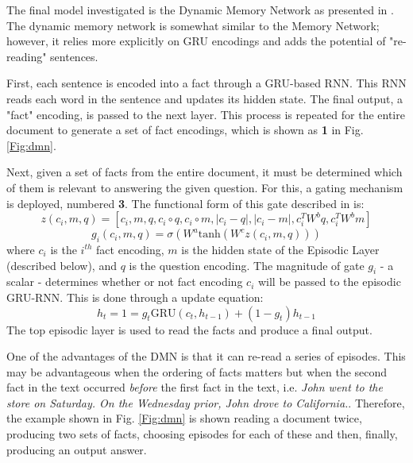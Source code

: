 \documentclass{article}
\begin{document}
The final model investigated is the Dynamic Memory Network as presented in \cite{dmn}.  The dynamic memory network is somewhat similar to the Memory Network; however, it relies more explicitly on GRU encodings and adds the potential of "re-reading" sentences.  \par
First, each sentence is encoded into a fact through a GRU-based RNN.  This RNN reads each word in the sentence and updates its hidden state.  The final output, a "fact" encoding, is passed to the next layer.  This process is repeated for the entire document to generate a set of fact encodings, which is shown as \textbf{1} in Fig. \ref{Fig:dmn}.  \par
Next, given a set of facts from the entire document, it must be determined which of them is relevant to answering the given question.  For this, a gating mechanism is deployed, numbered \textbf{3}.  The functional form of this gate described in \cite{dmn} is: 
\begin{equation}
z\left( c_i, m, q \right) = \left[ c_i, m, q, c_i \circ q, c_i \circ m, \lvert c_i - q \rvert , \lvert c_i - m \rvert , c_i^T W^b q , c_i^T W^b m     \right] 
\end{equation}
\begin{equation}
g_i \left( c_i, m, q \right) = \sigma \left(W^a \text{tanh} \left(  W^c z \left(c_i, m,q \right)  \right)   \right) 
\end{equation}
where $c_i $ is the $i^{th}$ fact encoding, $m$ is the hidden state of the Episodic Layer (described below), and $q$ is the question encoding.  The magnitude of gate $g_i$ - a scalar - determines whether or not fact encoding $c_i$ will be passed to the episodic GRU-RNN.  This is done through a update equation:  
\begin{equation}
h_t = 1 = g_t \text{GRU} \left( c_t, h_{t-1} \right)  +  \left( 1 - g_t \right) h_{t-1} 
\end{equation}
The top episodic layer is used to read the facts and produce a final output.  \par One of the advantages of the DMN is that it can re-read a series of episodes.  This may be advantageous when the ordering of facts matters but when the second fact in the text occurred \textit{before} the first fact in the text, i.e. \textit{John went to the store on Saturday.  On the Wednesday prior, John drove to California.}.  Therefore, the example shown in Fig. \ref{Fig:dmn} is shown reading a document twice, producing two sets of facts, choosing episodes for each of these and then, finally, producing an output answer.   
\end{document}
